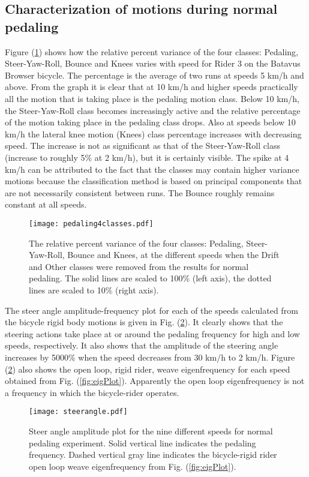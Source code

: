 \documentclass[smallextended]{svjour3}     %
\begin{document}
\subsection{Characterization of motions during normal pedaling}
\label{sec:normalPed}
Figure (\ref{jellybean}) shows how the relative percent variance of the four classes:
Pedaling, Steer-Yaw-Roll, Bounce and Knees varies with speed for Rider 3 on the
Batavus Browser bicycle. The percentage is the average of two runs at speeds 5 km/h and
above. From the graph it
is clear that at 10 km/h and higher speeds practically all the motion that is
taking place is the pedaling motion class. Below 10 km/h, the Steer-Yaw-Roll
class becomes increasingly active and the relative percentage of the motion
taking place in the pedaling class drops. Also at speeds below 10 km/h the
lateral knee motion (Knees) class percentage increases with decreasing speed.
The increase is not as significant as that of the Steer-Yaw-Roll class
(increase to roughly 5\% at 2 km/h), but it is certainly visible. The spike at
4 km/h can be attributed to the fact that the classes may contain higher
variance motions because the classification method is based on principal
components that are not necessarily consistent between runs. The Bounce
roughly remains constant at all speeds.
\begin{figure}[tbp]
    \centering
    \texttt{[image: pedaling4classes.pdf]}
    \caption{The relative percent variance of the four classes:
    Pedaling, Steer-Yaw-Roll, Bounce and Knees, at the different speeds when
    the Drift and Other classes were removed from the results for normal
    pedaling. The solid lines are scaled to 100\% (left axis), the dotted lines
    are scaled to 10\% (right axis).}
    \label{jellybean}
\end{figure}

The steer angle amplitude-frequency plot for each of the speeds calculated from
the bicycle rigid body motions is given in Fig. (\ref{pedalsteerangle}). It
clearly shows that the steering actions take place at or around the pedaling
frequency for high and low speeds, respectively. It also shows that the amplitude of the
steering angle increases by 5000\% when the speed decreases from 30 km/h to 2
km/h. Figure (\ref{pedalsteerangle}) also shows the open loop, rigid rider,
weave eigenfrequency for each speed obtained from Fig. (\ref{fig:eigPlot}).
Apparently the open loop eigenfrequency is not a frequency in which the
bicycle-rider operates.
\begin{figure}[tb]
    \centering
        \texttt{[image: steerangle.pdf]}\\
    \caption{Steer angle amplitude plot for the nine different speeds for
    normal pedaling experiment. Solid vertical line indicates the pedaling
    frequency. Dashed vertical gray line indicates the bicycle-rigid rider
    open loop weave eigenfrequency from Fig. (\ref{fig:eigPlot}).}
    \label{pedalsteerangle}
\end{figure}
\end{document}
